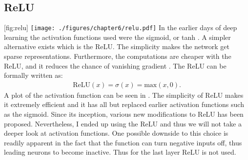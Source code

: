 \subsection{ReLU}
[fig:relu]
{\texttt{[image: ./figures/chapter6/relu.pdf]}} 
In the earlier days of deep learning the activation functions used were the sigmoid, or tanh \cite{yamashitaConvolutionalNeuralNetworks2018}.
A simpler alternative exists which is the \ac{ReLU}.
The simplicity makes the network get sparse representations. 
Furthermore, the computations are cheaper with the \ac{ReLU}, and it reduces the chance of vanishing gradient \cite{glorotDeepSparseRectifier2011}.
The ReLU can be formally written as: 
\begin{align}
\text{ReLU}(x) = \sigma(x) = \text{max}(x,0).%
\end{align}
A plot of the activation function can be seen in .
The simplicity of ReLU makes it extremely efficient and it has all but replaced earlier activation functions such as the sigmoid.
Since its inception, various new modifications to \ac{ReLU} has been proposed.
Nevertheless, I ended up using the \ac{ReLU} and thus we will not take a deeper look at activation functions.
One possible downside to this choice is readily apparent in the fact that the function can turn negative inputs off, thus leading neurons to become inactive. 
Thus for the last layer \ac{ReLU} is not used.
